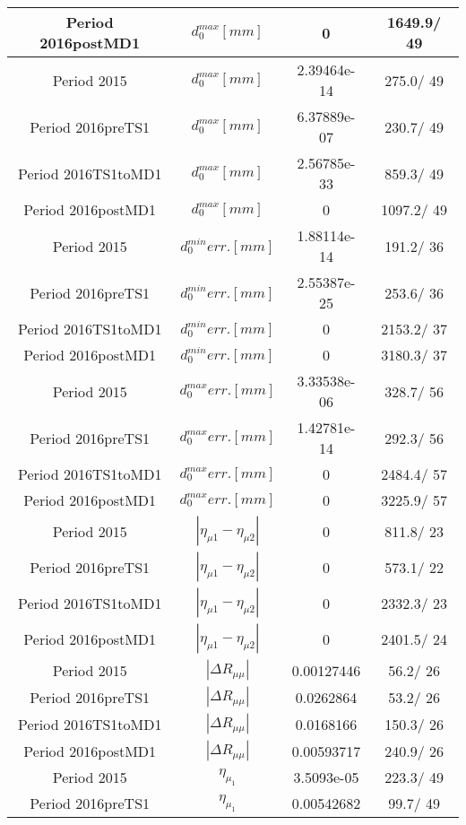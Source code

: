 \documentclass{article}
\begin{document}
\begin{longtable}{c|c|c|c}
\hline
 Period 2016postMD1 & $d_{0}^{max} [mm]$ & 0 & 1649.9/ 49\\
\hline
 Period 2015 & $d_{0}^{max} [mm]$ & 2.39464e-14 & 275.0/ 49\\
\hline
 Period 2016preTS1 & $d_{0}^{max} [mm]$ & 6.37889e-07 & 230.7/ 49\\
\hline
 Period 2016TS1toMD1 & $d_{0}^{max} [mm]$ & 2.56785e-33 & 859.3/ 49\\
\hline
 Period 2016postMD1 & $d_{0}^{max} [mm]$ & 0 & 1097.2/ 49\\
\hline
 Period 2015 & $d_{0}^{min} err. [mm]$ & 1.88114e-14 & 191.2/ 36\\
\hline
 Period 2016preTS1 & $d_{0}^{min} err. [mm]$ & 2.55387e-25 & 253.6/ 36\\
\hline
 Period 2016TS1toMD1 & $d_{0}^{min} err. [mm]$ & 0 & 2153.2/ 37\\
\hline
 Period 2016postMD1 & $d_{0}^{min} err. [mm]$ & 0 & 3180.3/ 37\\
\hline
 Period 2015 & $d_{0}^{max} err. [mm]$ & 3.33538e-06 & 328.7/ 56\\
\hline
 Period 2016preTS1 & $d_{0}^{max} err. [mm]$ & 1.42781e-14 & 292.3/ 56\\
\hline
 Period 2016TS1toMD1 & $d_{0}^{max} err. [mm]$ & 0 & 2484.4/ 57\\
\hline
 Period 2016postMD1 & $d_{0}^{max} err. [mm]$ & 0 & 3225.9/ 57\\
\hline
 Period 2015 & $|\eta_{\mu1}-\eta_{\mu2}|$ & 0 & 811.8/ 23\\
\hline
 Period 2016preTS1 & $|\eta_{\mu1}-\eta_{\mu2}|$ & 0 & 573.1/ 22\\
\hline
 Period 2016TS1toMD1 & $|\eta_{\mu1}-\eta_{\mu2}|$ & 0 & 2332.3/ 23\\
\hline
 Period 2016postMD1 & $|\eta_{\mu1}-\eta_{\mu2}|$ & 0 & 2401.5/ 24\\
\hline
 Period 2015 & $|\Delta R_{\mu \mu}|$ & 0.00127446 &  56.2/ 26\\
\hline
 Period 2016preTS1 & $|\Delta R_{\mu \mu}|$ & 0.0262864 &  53.2/ 26\\
\hline
 Period 2016TS1toMD1 & $|\Delta R_{\mu \mu}|$ & 0.0168166 & 150.3/ 26\\
\hline
 Period 2016postMD1 & $|\Delta R_{\mu \mu}|$ & 0.00593717 & 240.9/ 26\\
\hline
 Period 2015 & $\eta_{\mu_{1}}$ & 3.5093e-05 & 223.3/ 49\\
\hline
 Period 2016preTS1 & $\eta_{\mu_{1}}$ & 0.00542682 &  99.7/ 49\\

\end{longtable}
\end{document}
